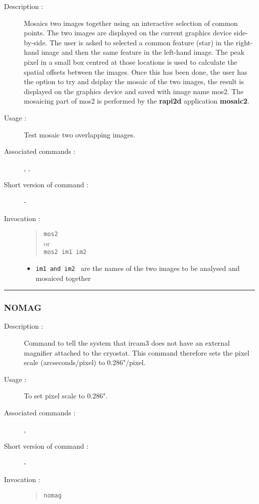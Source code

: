 \begin{description}

\item[Description :] Mosaics two images together using an interactive
selection of common points.  The two images are displayed on the
current graphics device side-by-side.  The user is asked to selected a
common feature (star) in the right-hand image and then the same feature
in the left-hand image. The peak pixel in a small box centred at those
locations is used to calculate the spatial offsets between the images.
Once this has been done, the user has the option to try and dsiplay the
mosaic of the two images, the result is displayed on the graphics
device and saved with image name mos2.  The mosaicing part of mos2 is
performed by the {\bf rapi2d} application {\bf mosaic2}.

\item[Usage :] Test mosaic two overlapping images.
\item[Associated commands :] {\tt {}},
{\tt {}}, {\tt {}}
\item[Short version of command :] -
\item[Invocation :]

\begin{quote}{\tt  mos2 }\\
or \\
{\tt mos2 im1 im2 }
\end{quote}

\begin{itemize}

\item {\tt im1 and im2 } are the names of the two images to be analysed
 and mosaiced together
\end{itemize}

\end{description}

\hrule
\subsubsection*{\label{NOMAG}NOMAG}

\begin{description}

\item[Description :] Command to tell the system that {\sc ircam3} does not
have an external magnifier attached to the cryostat.  This command therefore
sets the pixel scale (arcseconds/pixel) to 0.286"/pixel.

\item[Usage :] To set pixel scale to 0.286".
\item[Associated commands :] {\tt {}},
{\tt {}}
\item[Short version of command :] -
\item[Invocation :]

\begin{quote}{\tt  nomag }\end{quote}

\end{description}


